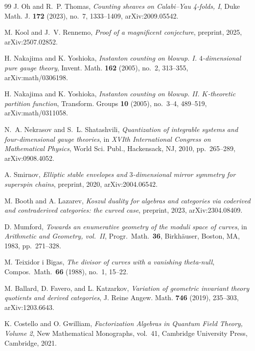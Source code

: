 \begin{thebibliography}{99}
J. Oh and R.~P. Thomas, \emph{Counting sheaves on Calabi--Yau 4-folds, I}, Duke Math. J. \textbf{172} (2023), no.~7, 1333--1409, arXiv:2009.05542.

M. Kool and J.~V. Rennemo, \emph{Proof of a magnificent conjecture}, preprint, 2025, arXiv:2507.02852.

H. Nakajima and K. Yoshioka, \emph{Instanton counting on blowup. I. $4$-dimensional pure gauge theory}, Invent. Math. \textbf{162} (2005), no.~2, 313--355, arXiv:math/0306198.

H. Nakajima and K. Yoshioka, \emph{Instanton counting on blowup. II. $K$-theoretic partition function}, Transform. Groups \textbf{10} (2005), no.~3--4, 489--519, arXiv:math/0311058.

N.~A. Nekrasov and S.~L. Shatashvili, \emph{Quantization of integrable systems and four-dimensional gauge theories}, in \emph{XVIth International Congress on Mathematical Physics}, World Sci. Publ., Hackensack, NJ, 2010, pp.~265--289, arXiv:0908.4052.

A. Smirnov, \emph{Elliptic stable envelopes and $3$-dimensional mirror symmetry for superspin chains}, preprint, 2020, arXiv:2004.06542.

M. Booth and A. Lazarev, \emph{Koszul duality for algebras and categories via coderived and contraderived categories: the curved case}, preprint, 2023, arXiv:2304.08409.

D. Mumford, \emph{Towards an enumerative geometry of the moduli space of curves}, in \emph{Arithmetic and Geometry, vol.\ II}, Progr.\ Math.\ \textbf{36}, Birkh\"auser, Boston, MA, 1983, pp.~271--328.

M. Teixidor i Bigas, \emph{The divisor of curves with a vanishing theta-null}, Compos.\ Math.\ \textbf{66} (1988), no.~1, 15--22.

M. Ballard, D. Favero, and L. Katzarkov, \emph{Variation of geometric invariant theory quotients and derived categories}, J. Reine Angew. Math. \textbf{746} (2019), 235--303, arXiv:1203.6643.

K. Costello and O. Gwilliam, \emph{Factorization Algebras in Quantum Field Theory, Volume 2}, New Mathematical Monographs, vol.~41, Cambridge University Press, Cambridge, 2021.


\end{thebibliography}
